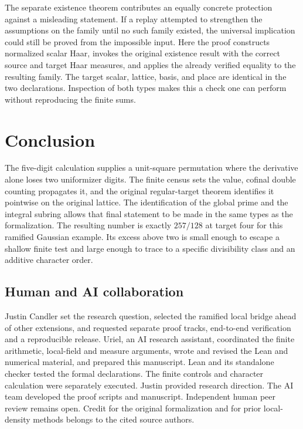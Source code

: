 \documentclass[12pt,letterpaper]{article}
\begin{document}
\par
The separate existence theorem contributes an equally concrete protection against a misleading statement. If a replay attempted to strengthen the assumptions on the family until no such family existed, the universal implication could still be proved from the impossible input. Here the proof constructs normalized scalar Haar, invokes the original existence result with the correct source and target Haar measures, and applies the already verified equality to the resulting family. The target scalar, lattice, basis, and place are identical in the two declarations. Inspection of both types makes this a check one can perform without reproducing the finite sums.

\section{Conclusion}
The five-digit calculation supplies a unit-square permutation where the derivative alone loses two uniformizer digits. The finite census sets the value, cofinal double counting propagates it, and the original regular-target theorem identifies it pointwise on the original lattice. The identification of the global prime and the integral subring allows that final statement to be made in the same types as the formalization. The resulting number is exactly $257/128$ at target four for this ramified Gaussian example. Its excess above two is small enough to escape a shallow finite test and large enough to trace to a specific divisibility class and an additive character order.
\subsection*{Human and AI collaboration}
Justin Candler set the research question, selected the ramified local bridge ahead of other extensions, and requested separate proof tracks, end-to-end verification and a reproducible release. Uriel, an AI research assistant, coordinated the finite arithmetic, local-field and measure arguments, wrote and revised the Lean and numerical material, and prepared this manuscript. Lean and its standalone checker tested the formal declarations. The finite controls and character calculation were separately executed. Justin provided research direction. The AI team developed the proof scripts and manuscript. Independent human peer review remains open. Credit for the original formalization and for prior local-density methods belongs to the cited source authors.
\end{document}
